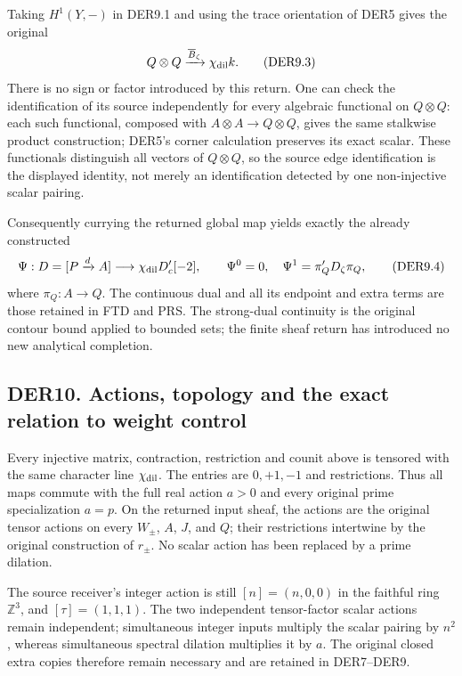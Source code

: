 Taking \(H^1(Y,-)\) in DER9.1 and using the trace orientation of DER5
gives the original \[
Q\otimes Q\xrightarrow{\overline B_\zeta}\chi_{\rm dil}k.
\tag{DER9.3}
\] There is no sign or factor introduced by this return. One can check
the identification of its source independently for every algebraic
functional on \(Q\otimes Q\): each such functional, composed with
\(A\otimes A\to Q\otimes Q\), gives the same stalkwise product
construction; DER5's corner calculation preserves its exact scalar.
These functionals distinguish all vectors of \(Q\otimes Q\), so the
source edge identification is the displayed identity, not merely an
identification detected by one non-injective scalar pairing.

Consequently currying the returned global map yields exactly the already
constructed \[
\Psi:D=[P\xrightarrow d A]\longrightarrow
 \chi_{\rm dil}D_c'[-2],\qquad
\Psi^0=0,\quad \Psi^1=\pi_Q'D_\zeta\pi_Q,
\tag{DER9.4}
\] where \(\pi_Q:A\to Q\). The continuous dual and all its endpoint and
extra terms are those retained in FTD and PRS. The strong-dual
continuity is the original contour bound applied to bounded sets; the
finite sheaf return has introduced no new analytical completion.

\subsection{DER10. Actions, topology and the exact relation to weight
control}\label{der10.-actions-topology-and-the-exact-relation-to-weight-control}

Every injective matrix, contraction, restriction and counit above is
tensored with the same character line \(\chi_{\rm dil}\). The entries
are \(0,+1,-1\) and restrictions. Thus all maps commute with the full
real action \(a>0\) and every original prime specialization \(a=p\). On
the returned input sheaf, the actions are the original tensor actions on
every \(W_\pm\), \(A\), \(J\), and \(Q\); their restrictions intertwine
by the original construction of \(r_\pm\). No scalar action has been
replaced by a prime dilation.

The source receiver's integer action is still \([n]=(n,0,0)\) in the
faithful ring \(\mathbb Z^3\), and \([\tau]=(1,1,1)\). The two
independent tensor-factor scalar actions remain independent;
simultaneous integer inputs multiply the scalar pairing by \(n^2\),
whereas simultaneous spectral dilation multiplies it by \(a\). The
original closed extra copies therefore remain necessary and are retained
in DER7--DER9.

